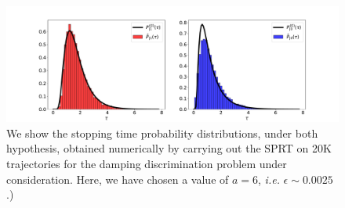 \begin{figure}[t!]
    \centering
    \includegraphics[width=1.\textwidth]{Figures/CMON/damp-discri/temp/stopp_time_b6_gamma429_both.pdf}
    \caption{We show the stopping time probability distributions, under both hypothesis, obtained numerically by carrying out the SPRT on 20K trajectories for the damping discrimination problem under consideration. Here, we have chosen a value of $a=6$, \textit{i.e.} $\epsilon\sim0.0025$.)}
    \label{fig:stop_time_distro}
\end{figure}


